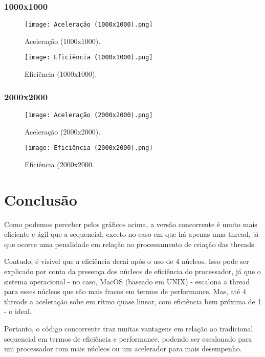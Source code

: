 \documentclass{article}
\begin{document}
\subsubsection{1000x1000}
\begin{figure}[ht!]
  \centering
  \begin{minipage}[b]{0.49\textwidth}
    \texttt{[image: Aceleração (1000x1000).png]}
    \caption{Aceleração (1000x1000).}
  \end{minipage}
  \hfill
  \begin{minipage}[b]{0.49\textwidth}
    \texttt{[image: Eficiência (1000x1000).png]}
    \caption{Eficiência (1000x1000).}
  \end{minipage}
\end{figure}

\clearpage
\subsubsection{2000x2000}
\begin{figure}[ht!]
  \centering
  \begin{minipage}[b]{0.49\textwidth}
    \texttt{[image: Aceleração (2000x2000).png]}
    \caption{Aceleração (2000x2000).}
  \end{minipage}
  \hfill
  \begin{minipage}[b]{0.49\textwidth}
    \texttt{[image: Eficiência (2000x2000).png]}
    \caption{Eficiência (2000x2000.}
  \end{minipage}
\end{figure}

\section{Conclusão}

Como podemos perceber pelos gráficos acima, a versão concorrente é muito mais eficiente e ágil que a sequencial, exceto no caso em que há apenas uma thread, já que ocorre uma penalidade em relação ao processamento de criação das threads.

Contudo, é visível que a eficiência decai após o uso de 4 núcleos. Isso pode ser explicado por conta da presença dos núcleos de eficiência do processador, já que o sistema operacional - no caso, MacOS (baseado em UNIX) - escalona a thread para esses núcleos que são mais fracos em termos de performance. Mas, até 4 threads a aceleração sobe em rítmo quase linear, com eficiência bem próxima de 1 - o ideal.

Portanto, o código concorrente traz muitas vantagens em relação ao tradicional sequencial em termos de eficiência e performance, podendo ser escalonado para um processador com mais núcleos ou um acelerador para mais desempenho.
\end{document}
